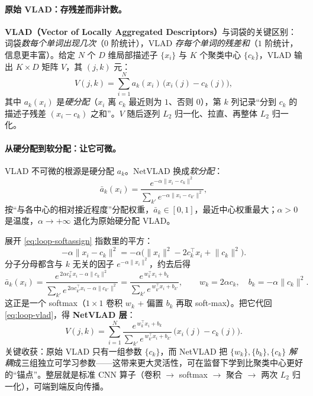 \paragraph{原始 VLAD：存残差而非计数。}
\textbf{VLAD（Vector of Locally Aggregated Descriptors）}与词袋的关键区别\cite{arandjelovic2016netvlad}：词袋\emph{数每个单词出现几次}（$0$ 阶统计），VLAD \emph{存每个单词的残差和}（$1$ 阶统计，信息更丰富）。给定 $N$ 个 $D$ 维局部描述子 $\{x_i\}$ 与 $K$ 个聚类中心 $\{c_k\}$，VLAD 输出 $K\times D$ 矩阵 $V$，其 $(j,k)$ 元：
\begin{equation}
  V(j,k)=\sum_{i=1}^{N} a_k(x_i)\,\big(x_i(j)-c_k(j)\big),
  \label{eq:loop-vlad}
\end{equation}
其中 $a_k(x_i)$ 是\emph{硬分配}（$x_i$ 离 $c_k$ 最近则为 $1$、否则 $0$），第 $k$ 列记录“分到 $c_k$ 的描述子残差 $(x_i-c_k)$ 之和”。$V$ 随后逐列 $L_2$ 归一化、拉直、再整体 $L_2$ 归一化。

\paragraph{从硬分配到软分配：让它可微。}
VLAD 不可微的根源是硬分配 $a_k$。NetVLAD 换成\emph{软分配}\cite{arandjelovic2016netvlad}：
\begin{equation}
  \bar a_k(x_i)=\frac{e^{-\alpha\lVert x_i-c_k\rVert^2}}{\sum_{k'} e^{-\alpha\lVert x_i-c_{k'}\rVert^2}},
  \label{eq:loop-softassign}
\end{equation}
按“与各中心的相对接近程度”分配权重，$\bar a_k\in[0,1]$，最近中心权重最大；$\alpha>0$ 是温度，$\alpha\to+\infty$ 退化为原始硬分配 VLAD。

\begin{derivation}
展开 \cref{eq:loop-softassign} 指数里的平方：
\[
  -\alpha\lVert x_i-c_k\rVert^2=-\alpha\big(\lVert x_i\rVert^2-2c_k^\top x_i+\lVert c_k\rVert^2\big).
\]
分子分母都含与 $k$ 无关的因子 $e^{-\alpha\lVert x_i\rVert^2}$，约去后得
\[
  \bar a_k(x_i)=\frac{e^{\,2\alpha c_k^\top x_i-\alpha\lVert c_k\rVert^2}}{\sum_{k'}e^{\,2\alpha c_{k'}^\top x_i-\alpha\lVert c_{k'}\rVert^2}}
  =\frac{e^{\,w_k^\top x_i+b_k}}{\sum_{k'} e^{\,w_{k'}^\top x_i+b_{k'}}},\qquad
  w_k=2\alpha c_k,\quad b_k=-\alpha\lVert c_k\rVert^2.
\]
这正是一个 softmax（$1\times1$ 卷积 $w_k$ + 偏置 $b_k$ 再取 soft-max）。把它代回 \cref{eq:loop-vlad}，得 \textbf{NetVLAD 层}：
\begin{equation}
  V(j,k)=\sum_{i=1}^{N}\frac{e^{\,w_k^\top x_i+b_k}}{\sum_{k'} e^{\,w_{k'}^\top x_i+b_{k'}}}\,\big(x_i(j)-c_k(j)\big).
  \label{eq:loop-netvlad-layer}
\end{equation}
关键收获：原始 VLAD 只有一组参数 $\{c_k\}$，而 NetVLAD 把 $\{w_k\},\{b_k\},\{c_k\}$ \emph{解耦}成三组独立可学习参数——这带来更大灵活性，可在监督下学到比聚类中心更好的“锚点”。整层就是标准 CNN 算子（卷积 $\to$ softmax $\to$ 聚合 $\to$ 两次 $L_2$ 归一化），可端到端反向传播。
\end{derivation}

